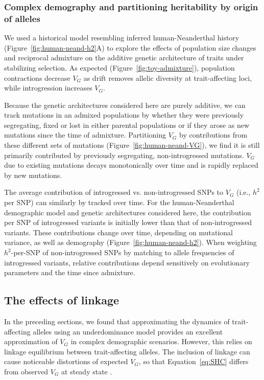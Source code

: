 \documentclass{article}
\begin{document}
\subsubsection*{Complex demography and partitioning heritability by origin of
alleles}

We used a historical model resembling inferred human-Neanderthal history
(Figure~\ref{fig:human-neand-h2}A) to explore the effects of population size
changes and reciprocal admixture on the additive genetic architecture of traits
under stabilizing selection. As expected (Figure~\ref{fig:toy-admixture}),
population contractions decrease $V_G$ as drift removes allelic diversity at
trait-affecting loci, while introgression increases $V_G$.

Because the genetic architectures considered here are purely additive, we can
track mutations in an admixed populations by whether they were previously
segregating, fixed or lost in either parental populations or if they arose as
new mutations since the time of admixture. Partitioning $V_G$ by contributions
from these different sets of mutations (Figure~\ref{fig:human-neand-VG}), we
find it is still primarily contributed by previously segregating,
non-introgressed mutations. $V_G$ due to existing mutations decays
monotonically over time and is rapidly replaced by new mutations.

The average contribution of introgressed vs. non-introgressed SNPs to $V_G$
(i.e., $h^2$ per SNP) can similarly by tracked over time. For the
human-Neanderthal demographic model and genetic architectures considered
here, the contribution per SNP of introgressed variants is initially lower than
that of non-introgressed variants. These contributions change over time,
depending on mutational variance, as well as demography
(Figure~\ref{fig:human-neand-h2}). When weighting $h^2$-per-SNP of
non-introgressed SNPs by matching to allele frequencies of introgressed
variants, relative contributions depend sensitively on evolutionary parameters
and the time since admixture.

\subsection*{The effects of linkage}

In the preceding sections, we found that approximating the dynamics of
trait-affecting alleles using an underdominance model
\citep{robertson1956effect} provides an excellent approximation of $V_G$ in
complex demographic scenarios. However, this relies on linkage equilibrium
between trait-affecting alleles. The inclusion of linkage can cause noticeable
distortions of expected $V_G$, so that Equation~\ref{eq:SHC} differs from
observed $V_G$ at steady state \citep{burger1989much, burger1994distribution,
walsh2018evolution}.
\end{document}
